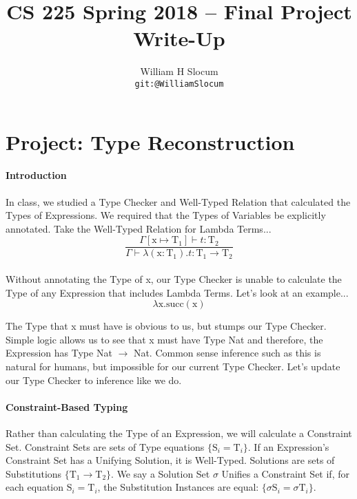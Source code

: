 \documentclass{article}
\title{CS 225 Spring 2018 -- Final Project Write-Up}
\author{
  William H Slocum \\ \small{\texttt{git:@WilliamSlocum}}
}
\begin{document}
\maketitle

\section*{Project: Type Reconstruction}

\paragraph{Introduction}
In class, we studied a Type Checker and Well-Typed Relation that calculated the Types of Expressions. We required that the Types of Variables be explicitly annotated. Take the Well-Typed Relation for Lambda Terms...
\\
\begin{equation*}
    \frac{\Gamma[\text{x} \mapsto \text{T}_{1}] \vdash t : \text{T}_{2}}
    {\Gamma \vdash \lambda(\text{x} : \text{T}_{1}).t : \text{T}_{1} \to \text{T}_{2}}
\end{equation*}
\\
Without annotating the Type of x, our Type Checker is unable to calculate the Type of any Expression that includes Lambda Terms. Let's look at an example...
\begin{equation*}
    \lambda\text{x}.\text{succ}(\text{x})
\end{equation*}

The Type that x must have is obvious to us, but stumps our Type Checker. Simple logic allows us to see that x must have Type Nat and therefore, the Expression has Type Nat $\to$ Nat. Common sense inference such as this is natural for humans, but impossible for our current Type Checker. Let's update our Type Checker to inference like we do.

\paragraph{Constraint-Based Typing}
Rather than calculating the Type of an Expression, we will calculate a Constraint Set. Constraint Sets are sets of Type equations $\{\text{S}_{i} = \text{T}_{i}\}$. If an Expression's Constraint Set has a Unifying Solution, it is Well-Typed. Solutions are sets of Substitutions $\{\text{T}_{1} \to \text{T}_{2}\}$. We say a Solution Set $\sigma$ Unifies a Constraint Set if, for each equation $\text{S}_{i} = \text{T}_{i}$, the Substitution Instances are equal: $\{\sigma\text{S}_{i} = \sigma\text{T}_{i}\}$.\\
\end{document}

